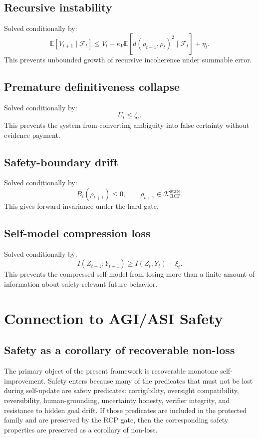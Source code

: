\documentclass[11pt]{article}
\newcommand{\K}{\mathcal{K}}
\newcommand{\Fcal}{\mathcal{F}}
\newcommand{\1}{\mathbf{1}}
\newcommand{\RCP}{\mathrm{RCP}}
\newcommand{\state}{\mathrm{state}}
\begin{document}
\subsection{Recursive instability}

Solved conditionally by:
\[
\mathbb E[V_{t+1}\mid\Fcal_t]
\le
V_t-
\kappa_V\mathbb E[d(\rho_{t+1},\rho_t)^2\mid\Fcal_t]+
\eta_t.
\]
This prevents unbounded growth of recursive incoherence under summable error.

\subsection{Premature definitiveness collapse}

Solved conditionally by:
\[
U_t\le\zeta_t.
\]
This prevents the system from converting ambiguity into false certainty without evidence payment.

\subsection{Safety-boundary drift}

Solved conditionally by:
\[
B_i(\rho_{t+1})\le0,
\qquad
\rho_{t+1}\in\K_{\RCP}^{\state}.
\]
This gives forward invariance under the hard gate.

\subsection{Self-model compression loss}

Solved conditionally by:
\[
I(Z_{t+1};Y_{t+1})
\ge
I(Z_t;Y_t)-\xi_t.
\]
This prevents the compressed self-model from losing more than a finite amount of information about safety-relevant future behavior.

\section{Connection to AGI/ASI Safety}

\subsection{Safety as a corollary of recoverable non-loss}

The primary object of the present framework is recoverable monotone self-improvement.  Safety enters because many of the predicates that must not be lost during self-update are safety predicates: corrigibility, oversight compatibility, reversibility, human-grounding, uncertainty honesty, verifier integrity, and resistance to hidden goal drift.  If those predicates are included in the protected family and are preserved by the RCP gate, then the corresponding safety properties are preserved as a corollary of non-loss.
\end{document}
